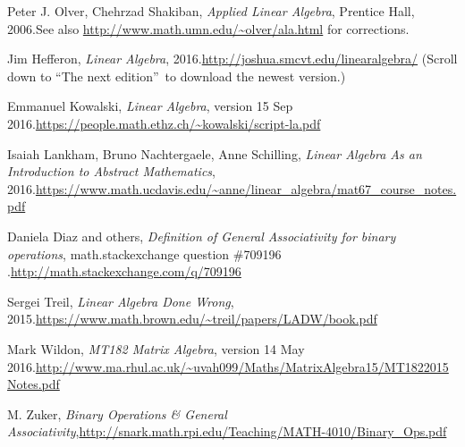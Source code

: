 \documentclass[numbers=enddot,12pt,final,onecolumn,notitlepage]{scrartcl}%
\theoremstyle{definition}
\begin{document}
\begin{thebibliography}{9999999999}
Peter J. Olver, Chehrzad Shakiban, \textit{Applied
Linear Algebra}, Prentice Hall, 2006.\newline See also
\url{http://www.math.umn.edu/~olver/ala.html} for corrections.

Jim Hefferon, \textit{Linear Algebra},
2016.\newline\url{http://joshua.smcvt.edu/linearalgebra/} (Scroll down to
\textquotedblleft The next edition\textquotedblright\ to download the newest version.)

Emmanuel Kowalski, \textit{Linear Algebra},
version 15 Sep 2016.\newline\url{https://people.math.ethz.ch/~kowalski/script-la.pdf}

Isaiah Lankham, Bruno Nachtergaele, Anne
Schilling, \textit{Linear Algebra As an Introduction to Abstract Mathematics},
2016.\newline\url{https://www.math.ucdavis.edu/~anne/linear_algebra/mat67_course_notes.pdf}

Daniela Diaz and others, \textit{Definition of
General Associativity for binary operations}, math.stackexchange question
\#709196 .\newline\url{http://math.stackexchange.com/q/709196}

Sergei Treil, \textit{Linear Algebra Done Wrong},
2015.\newline\url{https://www.math.brown.edu/~treil/papers/LADW/book.pdf}

Mark Wildon, \textit{MT182 Matrix Algebra},
version 14 May 2016.\newline\url{http://www.ma.rhul.ac.uk/~uvah099/Maths/MatrixAlgebra15/MT1822015Notes.pdf}

M. Zuker, \textit{Binary Operations \& General
Associativity},\newline\url{http://snark.math.rpi.edu/Teaching/MATH-4010/Binary_Ops.pdf}
\end{thebibliography}
\end{document}
